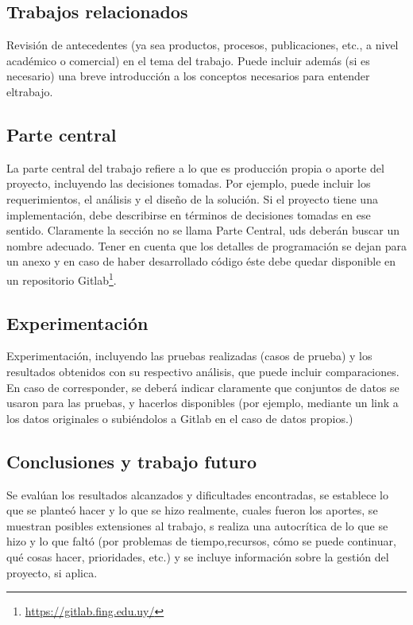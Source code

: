 \documentclass[journal,onecolumn]{IEEEtran}
\begin{document}
\subsection{Trabajos relacionados}
\label{relacionados}
Revisión de antecedentes (ya sea productos, procesos, publicaciones, etc., a nivel académico   o   comercial)   en   el   tema   del   trabajo.   Puede   incluir   además   (si   es necesario)   una   breve   introducción   a   los   conceptos   necesarios   para   entender   eltrabajo.

\subsection{Parte central}
\label{desarrollo}
La  parte central  del   trabajo   refiere   a   lo   que   es   producción   propia   o   aporte   del proyecto, incluyendo las decisiones tomadas. Por ejemplo, puede incluir los requerimientos, el análisis y el diseño de la solución. Si el proyecto tiene una implementación, debe describirse en términos de decisiones tomadas en ese sentido. Claramente la sección no se llama Parte Central, uds deberán buscar un nombre adecuado. Tener en cuenta que los detalles de programación se dejan para un anexo y en caso de haber desarrollado código éste debe quedar disponible en un repositorio Gitlab\footnote{\url{https://gitlab.fing.edu.uy/}}.

\subsection{Experimentación}
\label{expe}
Experimentación, incluyendo   las   pruebas   realizadas   (casos   de   prueba)   y   los resultados obtenidos con su respectivo análisis, que puede incluir comparaciones. En caso de corresponder, se deberá indicar claramente que conjuntos de datos se usaron para las pruebas, y hacerlos disponibles (por ejemplo, mediante un link a los datos originales o subiéndolos a Gitlab en el caso de datos propios.)

\subsection{Conclusiones y trabajo futuro}
\label{conclusion}
Se   evalúan   los   resultados   alcanzados    y dificultades   encontradas,   se   establece   lo   que   se   planteó   hacer   y   lo   que   se   hizo realmente, cuales fueron los aportes, se  muestran posibles extensiones al trabajo, s realiza una autocrítica de lo que se hizo y lo que faltó (por problemas de tiempo,recursos, cómo se puede continuar, qué cosas hacer, prioridades, etc.) y se incluye información sobre la gestión del proyecto, si aplica.




%


\end{document}
